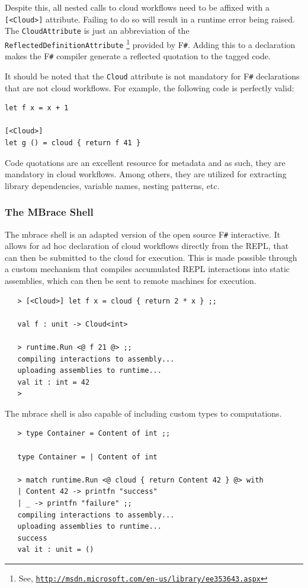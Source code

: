 \documentclass[9pt,a4paper]{article}
\newcommand{\mbrace}{mbrace}
\newcommand{\TitularMbrace}{MBrace}
\newcommand{\fsharp}{F\texttt \#}
\newcommand{\samehref}[1]{\href{#1}{\texttt{#1}}}
\begin{document}
Despite this, all nested calls to cloud workflows need to be affixed with a \texttt{[<Cloud>]}
attribute. Failing to do so will result in a runtime error being raised.
The \texttt{CloudAttribute} is just an abbreviation of the \texttt{ReflectedDefinitionAttribute}%
\footnote{See, \samehref{http://msdn.microsoft.com/en-us/library/ee353643.aspx}}
provided by \fsharp{}. Adding this to a declaration makes the \fsharp{} compiler generate a 
reflected quotation to the tagged code.

It should be noted that the \texttt{Cloud} attribute is not mandatory for \fsharp{} declarations that
are not cloud workflows. For example, the following code is perfectly valid:
\begin{lstlisting}
let f x = x + 1

[<Cloud>]
let g () = cloud { return f 41 }
\end{lstlisting}

Code quotations are an excellent resource for metadata and as such, they are mandatory
in cloud workflows. Among others, they are utilized for extracting library dependencies,
variable names, nesting patterns, etc.

\subsubsection*{The \TitularMbrace{} Shell}

The \mbrace{} shell is an adapted version of the open source \fsharp{} interactive.
It allows for ad hoc declaration of cloud workflows directly from the REPL, that
can then be submitted to the cloud for execution. This is made possible through
a custom mechanism that compiles accumulated REPL interactions into static assemblies,
which can then be sent to remote machines for execution.
\begin{verbatim}
   > [<Cloud>] let f x = cloud { return 2 * x } ;;

   val f : unit -> Cloud<int>

   > runtime.Run <@ f 21 @> ;;
   compiling interactions to assembly... 
   uploading assemblies to runtime... 
   val it : int = 42
   >
\end{verbatim}
The \mbrace{} shell is also capable of including custom types to computations.
\begin{verbatim}
   > type Container = Content of int ;;

   type Container = | Content of int

   > match runtime.Run <@ cloud { return Content 42 } @> with
   | Content 42 -> printfn "success"
   | _ -> printfn "failure" ;;
   compiling interactions to assembly... 
   uploading assemblies to runtime... 
   success
   val it : unit = ()
\end{verbatim}
\end{document}
